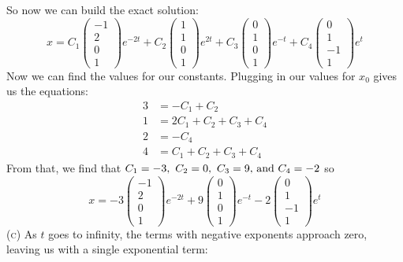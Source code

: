 \documentclass[11pt,answers]{exam}
\begin{document}
\begin{questions}
\begin{solution}
\[\]
So now we can build the exact solution:
\[
x = C_1\left(\begin{array}{c}-1\\ 2 \\ 0 \\ 1\end{array}\right) e^{-2t}+ C_2 \left(\begin{array}{c}1 \\ 1 \\ 0 \\ 1\end{array}\right)e^{2t} + C_3\left(\begin{array}{c}0 \\ 1 \\ 0 \\ 1\end{array}\right)e^{-t} + C_4\left(\begin{array}{c}0 \\ 1 \\ -1 \\ 1\end{array}\right)e^{t}
\]
Now we can find the values for our constants.  Plugging in our values for $x_0$ gives us the equations:
\begin{align*}
3 &= -C_1 + C_2 \\
1 &= 2C_1 + C_2 + C_3 + C_4 \\
2 &= -C_4 \\
4 &= C_1 + C_2 + C_3 + C_4
\end{align*}
From that, we find that $C_1 = -3, ~ C_2 = 0, ~ C_3 = 9\hbox{, and } C_4 = -2$ so
\[
x =
-3\left(\begin{array}{c}-1\\ 2 \\ 0 \\ 1\end{array}\right) e^{-2t} + 
9\left(\begin{array}{c}0 \\ 1 \\ 0 \\ 1\end{array}\right)e^{-t} - 
2\left(\begin{array}{c}0 \\ 1 \\ -1 \\ 1\end{array}\right)e^{t}
\]
\newline\textsc{(c)} As $t$ goes to infinity, the terms with negative exponents approach zero, leaving us with a single exponential term:

\end{solution}
\end{questions}
\end{document}
